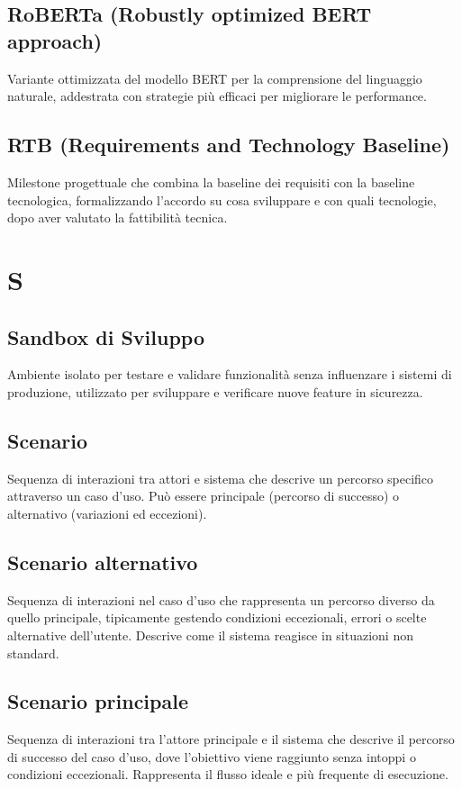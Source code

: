 \documentclass[a4paper,11pt]{article}
\begin{document}
\subsection{RoBERTa (Robustly optimized BERT approach)}
Variante ottimizzata del modello BERT per la comprensione del linguaggio naturale, addestrata con strategie più efficaci per migliorare le performance.

\subsection{RTB (Requirements and Technology Baseline)}
Milestone progettuale che combina la baseline dei requisiti con la baseline tecnologica, formalizzando l'accordo su cosa sviluppare e con quali tecnologie, dopo aver valutato la fattibilità tecnica.

\newpage
\section{S}

\subsection{Sandbox di Sviluppo}
Ambiente isolato per testare e validare funzionalità senza influenzare i sistemi di produzione, utilizzato per sviluppare e verificare nuove feature in sicurezza.

\subsection{Scenario}
Sequenza di interazioni tra attori e sistema che descrive un percorso specifico attraverso un caso d'uso. Può essere principale (percorso di successo) o alternativo (variazioni ed eccezioni).

\subsection{Scenario alternativo}
Sequenza di interazioni nel caso d'uso che rappresenta un percorso diverso da quello principale, tipicamente gestendo condizioni eccezionali, errori o scelte alternative dell'utente. Descrive come il sistema reagisce in situazioni non standard.

\subsection{Scenario principale}
Sequenza di interazioni tra l'attore principale e il sistema che descrive il percorso di successo del caso d'uso, dove l'obiettivo viene raggiunto senza intoppi o condizioni eccezionali. Rappresenta il flusso ideale e più frequente di esecuzione.
\end{document}
